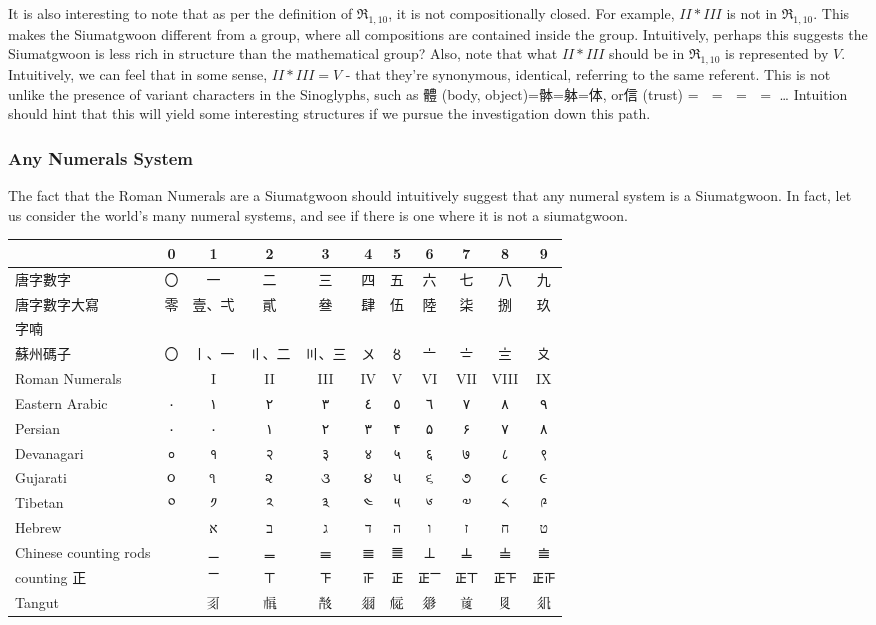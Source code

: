 It is also interesting to note that as per the definition of $\mathfrak{R}_{1,10}$, it is not compositionally closed. For example, $II * III$ is not in $\mathfrak{R}_{1,10}$. This makes the Siumatgwoon different from a group, where all compositions are contained inside the group. Intuitively, perhaps this suggests the Siumatgwoon is less rich in structure than the mathematical group? Also, note that what $II * III$ should be in $\mathfrak{R}_{1,10}$ is represented by $V$. Intuitively, we can feel that in some sense, $II * III = V$ - that they're synonymous, identical, referring to the same referent. This is not unlike the presence of variant characters in the Sinoglyphs, such as 體 (body, object)=骵=躰=体, or信 (trust) = 𬢭 = 伩 = 訫 = 㐰… Intuition should hint that this will yield some interesting structures if we pursue the investigation down this path.

\subsubsection{Any Numerals System}

The fact that the Roman Numerals are a Siumatgwoon should intuitively suggest that any numeral system is a Siumatgwoon. In fact, let us consider the world's many numeral systems, and see if there is one where it is not a siumatgwoon. 

\begin{center}
\begin{tabular}{|l|c|c|c|c|c|c|c|c|c|c|}
\hline
 & 0 & 1 & 2 & 3 & 4 & 5 & 6 & 7 & 8 & 9 \\
\hline
唐字數字 & 〇 & 一 & 二 & 三 & 四 & 五 & 六 & 七 & 八 & 九 \\
\hline
唐字數字大寫 & 零 & 壹、弌 & 貳 & 叄 & 肆 & 伍 & 陸 & 柒 & 捌 & 玖 \\
\hline
字喃 &  & 𠬠 & 𠄩 & 𠀧 & 𦊚 & 𠄼 & 𦒹 & 𦉱 & 𠔭 & 𠃩 \\
\hline
蘇州碼子 & 〇 & 〡、一 & 〢、二 & 〣、三 & 〤 & 〥 & 〦 & 〧 & 〨 & 〩 \\
\hline
Roman Numerals &  & I & II & III & IV & V & VI & VII & VIII & IX \\
\hline
Eastern Arabic & ٠ & ١ & ٢ & ٣ & ٤ & ٥ & ٦ & ٧ & ٨ & ٩ \\
\hline
Persian & ٠ & ۰ & ۱ & ۲ & ۳ & ۴ & ۵ & ۶ & ۷ & ۸ \\
\hline
Devanagari & ० & १ & २ & ३ & ४ & ५ & ६ & ७ & ८ & ९ \\
\hline
Gujarati & ૦ & ૧ & ૨ & ૩ & ૪ & ૫ & ૬ & ૭ & ૮ & ૯ \\
\hline
Tibetan & ༠ & ༡ & ༢ & ༣ & ༤ & ༥ & ༦ & ༧ & ༨ & ༩ \\
\hline
Hebrew &  & א & ב & ג & ד & ה & ו & ז & ח & ט \\
\hline
Chinese counting rods &  & 𝍠 & 𝍡 & 𝍢 & 𝍣 & 𝍤 & 𝍥 & 𝍦 & 𝍧 & 𝍨 \\
\hline
counting 正 &  & 𝍲 & 𝍳 & 𝍴 & 𝍵 & 𝍶 & 𝍶𝍲 & 𝍶𝍳 & 𝍶𝍴 & 𝍶𝍵 \\
\hline
Tangut &  & 𘈩 & 𗍫 & 𘕕 & 𗥃 & 𗏁 & 𗤁 & 𗒹 & 𘉋 & 𗢭 \\
\hline
\end{tabular}
\end{center}

